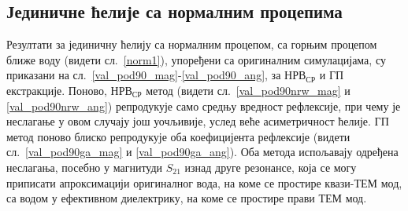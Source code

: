 \documentclass[main.tex]{subfiles}
\begin{document}
\subsection{Јединичне ћелије са нормалним процепима}
Резултати за јединичну ћелију са нормалним процепом, са горњим процепом ближе воду (видети сл.~\ref{norm1}), упоређени са оригиналним симулацијама, су приказани на сл.~\ref{val_pod90_mag}-\ref{val_pod90_ang}, за $НРВ_{СР}$ и ГП екстракције. Поново, $НРВ_{СР}$ метод (видети сл.~\ref{val_pod90nrw_mag} и \ref{val_pod90nrw_ang}) репродукује само средњу вредност рефлексије, при чему је неслагање у овом случају још уочљивије, услед веће асиметричност ћелије. ГП метод поново блиско репродукује оба коефицијента рефлексије (видети сл.~\ref{val_pod90ga_mag} и \ref{val_pod90ga_ang}). Оба метода испољавају одређена неслагања, посебно у магнитуди $S_{21}$ изнад друге резонансе, која се могу приписати апроксимацији оригиналног вода, на коме се простире квази-ТЕМ мод, са водом у ефективном диелектрику, на коме се простире прави ТЕМ мод.
\end{document}
